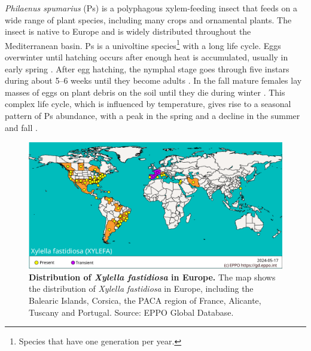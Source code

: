 \textit{Philaenus spumarius} (Ps) is a polyphagous xylem-feeding insect that
feeds
on a wide range of plant species, including many crops and ornamental plants.
The insect is native to Europe and is widely distributed throughout the
Mediterranean basin. Ps is a univoltine species\footnote{Species that have one
  generation per year.} with a long life cycle. Eggs overwinter until hatching
occurs after enough heat is accumulated, usually in early spring
\cite{morente2018distribution}. After egg hatching, the  nymphal stage goes
through five instars during about 5–6 weeks until they become adults
\cite{weaver1954meadow}. In the fall mature females lay masses of eggs on plant
debris on the soil until they die during winter \cite{Lago2023}. This complex
life cycle, which is influenced by temperature, gives rise to a seasonal
pattern of Ps abundance, with a peak in the spring and a decline in the summer
and fall \cite{Lopez2021}.

\begin{figure}[H]
  \centering
  \includegraphics[width=\textwidth]{Figures/Xf_distribution.pdf}
  \caption[Distribution of \textit{Xylella fastidiosa} in Europe]{
    \textbf{Distribution of \textit{Xylella fastidiosa} in Europe.} The map
    shows the distribution of \textit{Xylella fastidiosa} in Europe, including
    the Balearic Islands, Corsica, the PACA region of France, Alicante, Tuscany
    and Portugal. Source: EPPO Global Database.}
  \label{fig:Xf_distribution}
\end{figure}

